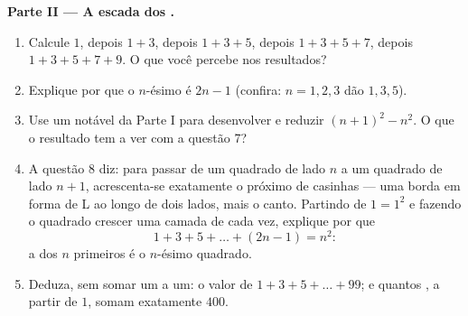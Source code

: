 \begin{problem}[{Problema de fim de semana --- $(a+b)^2$, $(a-b)^2$,
$(a+b)(a-b)$, e a soma $1 + 3 + 5 + \dots + (2n-1) = n^2$}]
\medskip
\noindent\textbf{Parte II --- A escada dos .}
\begin{enumerate}[resume]
  \item Calcule $1$, depois $1 + 3$, depois $1 + 3 + 5$, depois
        $1 + 3 + 5 + 7$, depois $1 + 3 + 5 + 7 + 9$. O que você percebe
        nos resultados?
  \item Explique por que o $n$-ésimo  é $2n - 1$ (confira:
        $n = 1, 2, 3$ dão $1, 3, 5$).
  \item Use um  notável da Parte I para desenvolver e reduzir
        $(n + 1)^2 - n^2$. O que o resultado tem a ver com a questão
        7?
  \item A questão 8 diz: para passar de um quadrado de lado $n$ a um
        quadrado de lado $n + 1$, acrescenta-se exatamente o próximo
         de casinhas --- uma borda em forma de L ao longo
        de dois lados, mais o canto. Partindo de $1 = 1^2$ e fazendo o
        quadrado crescer uma camada de cada vez, explique por que
        \[
        1 + 3 + 5 + \dots + (2n - 1) = n^2 :
        \]
        a  dos $n$ primeiros  é o $n$-ésimo
        quadrado.
  \item Deduza, sem somar um a um: o valor de
        $1 + 3 + 5 + \dots + 99$; e quantos , a partir
        de $1$, somam exatamente $400$.
\end{enumerate}


\end{problem}
